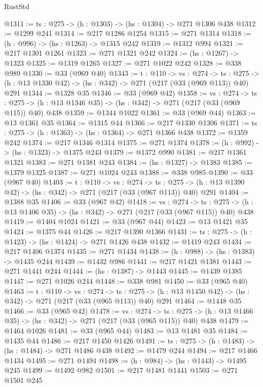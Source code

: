 \begin{lexlean}{RustStd}
\begin{coremodule}
@1311 := {ts : @275} -> (h : @1303) -> (hs : @1304) -> @271 @1306 @438
@1312 := @1299 @241
@1314 := @217 @1286 @1254
@1315 := @271 @1314
@1318 := (h : @996) -> (hs : @1263) -> @1315 @242
@1319 := @1312 @994
@1321 := @217 @1301 @1261
@1323 := @271 @1321 @242
@1324 := (hs : @1267) -> @1323
@1325 := @1319 @1265
@1327 := @271 @1022 @242
@1328 := @338 @989
@1330 := @33 (@969 @40)
@1343 := {t : @110} ->
  {vs : @274} ->
  {ts : @275} -> (h : @13 @1330 @42) -> (hs : @342) -> @271 (@217 (@33 (@969 @113)) @40) @291
@1344 := @1328 @35
@1346 := @33 (@969 @42)
@1358 := {vs : @274} ->
  {ts : @275} -> (h : @13 @1346 @35) -> (hs : @342) -> @271 (@217 (@33 (@969 @115)) @40) @438
@1359 := @1344 @1022
@1361 := @33 (@969 @44)
@1363 := @13 @1361 @35
@1364 := @1315 @44
@1366 := @217 @1330 @1306
@1371 := {ts : @275} -> (h : @1363) -> (hs : @1364) -> @271 @1366 @438
@1372 := @1359 @242
@1374 := @217 @1346 @1314
@1375 := @271 @1374
@1378 := (h : @992) -> (hs : @1323) -> @1375 @243
@1379 := @1372 @990
@1381 := @217 @1361 @1321
@1383 := @271 @1381 @243
@1384 := (hs : @1327) -> @1383
@1385 := @1379 @1325
@1387 := @271 @1024 @243
@1388 := @338 @985
@1390 := @33 (@967 @40)
@1403 := {t : @110} ->
  {vs : @274} ->
  {ts : @275} -> (h : @13 @1390 @42) -> (hs : @342) -> @271 (@217 (@33 (@967 @113)) @40) @291
@1404 := @1388 @35
@1406 := @33 (@967 @42)
@1418 := {vs : @274} ->
  {ts : @275} -> (h : @13 @1406 @35) -> (hs : @342) -> @271 (@217 (@33 (@967 @115)) @40) @438
@1419 := @1404 @1024
@1421 := @33 (@967 @44)
@1423 := @13 @1421 @35
@1424 := @1375 @44
@1426 := @217 @1390 @1366
@1431 := {ts : @275} -> (h : @1423) -> (hs : @1424) -> @271 @1426 @438
@1432 := @1419 @243
@1434 := @217 @1406 @1374
@1435 := @271 @1434
@1438 := (h : @988) -> (hs : @1383) -> @1435 @244
@1439 := @1432 @986
@1441 := @217 @1421 @1381
@1443 := @271 @1441 @244
@1444 := (hs : @1387) -> @1443
@1445 := @1439 @1385
@1447 := @271 @1026 @244
@1448 := @338 @981
@1450 := @33 (@965 @40)
@1463 := {t : @110} ->
  {vs : @274} ->
  {ts : @275} -> (h : @13 @1450 @42) -> (hs : @342) -> @271 (@217 (@33 (@965 @113)) @40) @291
@1464 := @1448 @35
@1466 := @33 (@965 @42)
@1478 := {vs : @274} ->
  {ts : @275} -> (h : @13 @1466 @35) -> (hs : @342) -> @271 (@217 (@33 (@965 @115)) @40) @438
@1479 := @1464 @1026
@1481 := @33 (@965 @44)
@1483 := @13 @1481 @35
@1484 := @1435 @44
@1486 := @217 @1450 @1426
@1491 := {ts : @275} -> (h : @1483) -> (hs : @1484) -> @271 @1486 @438
@1492 := @1479 @244
@1494 := @217 @1466 @1434
@1495 := @271 @1494
@1498 := (h : @984) -> (hs : @1443) -> @1495 @245
@1499 := @1492 @982
@1501 := @217 @1481 @1441
@1503 := @271 @1501 @245

\end{coremodule}
\end{lexlean}

